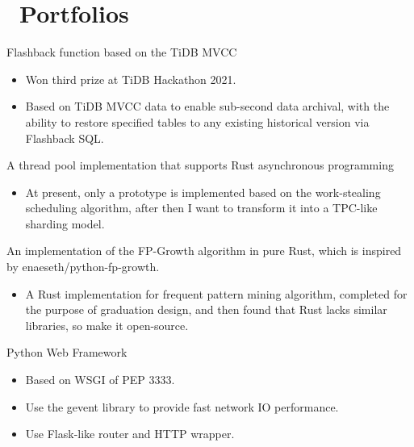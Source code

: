 \documentclass{resume}
\newcommand{\en}[1]{#1}
\newcommand{\zh}[1]{}
\begin{document}
\section{\faGithubAlt\ \en{Portfolios}\zh{个人项目}}
\en{Flashback function based on the TiDB MVCC}
\zh{基于 TiDB MVCC 特性实现的 Flashback 功能}
\begin{itemize}
      \item \en{Won third prize at TiDB Hackathon 2021.}
            \zh{项目获得 TiDB Hackathon 2021 三等奖}
      \item \en{Based on TiDB MVCC data to enable sub-second data archival, with the ability to restore specified tables to any existing historical version via Flashback SQL.}
            \zh{基于 TiDB 的 MVCC 数据实现了亚秒级别的数据回档，能够通过 Flashback SQL 将指定表还原至现存的任意历史版本}
\end{itemize}

\en{A thread pool implementation that supports Rust asynchronous programming}
\zh{一个支持 Rust 异步编程的线程池实现}
\begin{itemize}
      \item \en{At present, only a prototype is implemented based on the work-stealing scheduling algorithm, after then I want to transform it into a TPC-like sharding model.}
            \zh{目前只基于工作窃取调度算法实现了一个雏形，后续想改造成类似 TPC 的 Sharding 模型}
\end{itemize}

\en{An implementation of the FP-Growth algorithm in pure Rust, which is inspired by enaeseth/python-fp-growth.}
\zh{FP-Growth 算法的 Rust 实现，项目灵感来自于 enaeseth/python-fp-growth}
\begin{itemize}
      \item \en{A Rust implementation for frequent pattern mining algorithm, completed for the purpose of graduation design, and then found that Rust lacks similar libraries, so make it open-source.}
            \zh{一个用于进行频繁项集挖掘算法的 Rust 实现，出于实现毕业设计的目的完成，后发现 Rust 缺少同类库，遂将其单独开源}
\end{itemize}

\en{Python Web Framework}
\zh{Python Web 框架}
\begin{itemize}
      \item \en{Based on WSGI of PEP 3333.}
            \zh{基于 PEP 3333 的 WSGI 实现}
      \item \en{Use the gevent library to provide fast network IO performance.}
            \zh{使用 gevent 库提供快速的网络 IO 表现}
      \item \en{Use Flask-like router and HTTP wrapper.}
            \zh{使用了类 Flask 的路由功能和 HTTP 封装}
\end{itemize}
\end{document}
